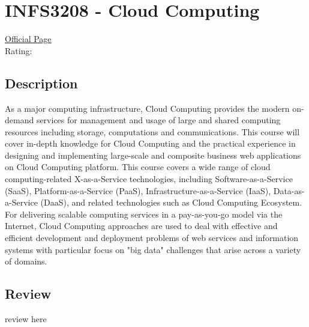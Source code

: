 \hypertarget{INFS3208}{\section{INFS3208 - Cloud Computing}}

\large
\textcolor{turbo_purple}{\href{https://my.uq.edu.au/programs-courses/course.html?course_code=INFS3208}{Official Page}} \\
Rating: \cstar\cstar\cstar\cstar\ostar

\normalsize
\subsection*{Description}
As a major computing infrastructure, Cloud Computing provides the modern on-demand services for management and usage of large and shared computing resources including storage, computations and communications.
This course will cover in-depth knowledge for Cloud Computing and the practical experience in designing and implementing large-scale and composite business web applications on Cloud Computing platform.
This course covers a wide range of cloud computing-related X-as-a-Service technologies, including Software-as-a-Service (SaaS), Platform-as-a-Service (PaaS), Infrastructure-as-a-Service (IaaS), Data-as-a-Service (DaaS), and related technologies such as Cloud Computing Ecosystem.
For delivering scalable computing services in a pay-as-you-go model via the Internet, Cloud Computing approaches are used to deal with effective and efficient development and deployment problems of web services and information systems with particular focus on "big data" challenges that arise across a variety of domains.

\subsection*{Review}
review here
